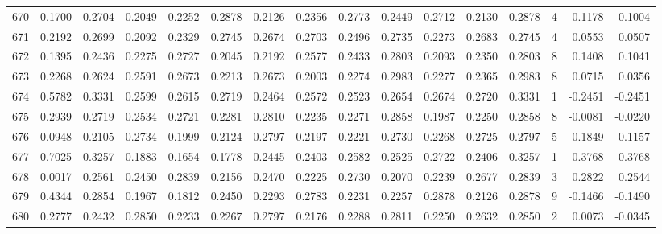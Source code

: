 \begin{tabular}{lrrrrrrrrrrrrrrr}
670 &      0.1700 &  0.2704 &  0.2049 &  0.2252 &  0.2878 &  0.2126 &  0.2356 &  0.2773 &  0.2449 &  0.2712 &   0.2130 &     0.2878 &      4 &                    0.1178 &                     0.1004 \\
671 &      0.2192 &  0.2699 &  0.2092 &  0.2329 &  0.2745 &  0.2674 &  0.2703 &  0.2496 &  0.2735 &  0.2273 &   0.2683 &     0.2745 &      4 &                    0.0553 &                     0.0507 \\
672 &      0.1395 &  0.2436 &  0.2275 &  0.2727 &  0.2045 &  0.2192 &  0.2577 &  0.2433 &  0.2803 &  0.2093 &   0.2350 &     0.2803 &      8 &                    0.1408 &                     0.1041 \\
673 &      0.2268 &  0.2624 &  0.2591 &  0.2673 &  0.2213 &  0.2673 &  0.2003 &  0.2274 &  0.2983 &  0.2277 &   0.2365 &     0.2983 &      8 &                    0.0715 &                     0.0356 \\
674 &      0.5782 &  0.3331 &  0.2599 &  0.2615 &  0.2719 &  0.2464 &  0.2572 &  0.2523 &  0.2654 &  0.2674 &   0.2720 &     0.3331 &      1 &                   -0.2451 &                    -0.2451 \\
675 &      0.2939 &  0.2719 &  0.2534 &  0.2721 &  0.2281 &  0.2810 &  0.2235 &  0.2271 &  0.2858 &  0.1987 &   0.2250 &     0.2858 &      8 &                   -0.0081 &                    -0.0220 \\
676 &      0.0948 &  0.2105 &  0.2734 &  0.1999 &  0.2124 &  0.2797 &  0.2197 &  0.2221 &  0.2730 &  0.2268 &   0.2725 &     0.2797 &      5 &                    0.1849 &                     0.1157 \\
677 &      0.7025 &  0.3257 &  0.1883 &  0.1654 &  0.1778 &  0.2445 &  0.2403 &  0.2582 &  0.2525 &  0.2722 &   0.2406 &     0.3257 &      1 &                   -0.3768 &                    -0.3768 \\
678 &      0.0017 &  0.2561 &  0.2450 &  0.2839 &  0.2156 &  0.2470 &  0.2225 &  0.2730 &  0.2070 &  0.2239 &   0.2677 &     0.2839 &      3 &                    0.2822 &                     0.2544 \\
679 &      0.4344 &  0.2854 &  0.1967 &  0.1812 &  0.2450 &  0.2293 &  0.2783 &  0.2231 &  0.2257 &  0.2878 &   0.2126 &     0.2878 &      9 &                   -0.1466 &                    -0.1490 \\
680 &      0.2777 &  0.2432 &  0.2850 &  0.2233 &  0.2267 &  0.2797 &  0.2176 &  0.2288 &  0.2811 &  0.2250 &   0.2632 &     0.2850 &      2 &                    0.0073 &                    -0.0345 \\

\end{tabular}
